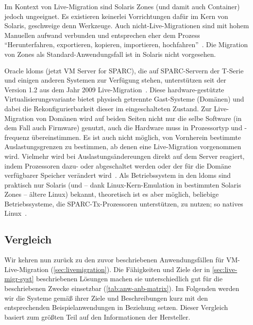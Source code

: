 Im Kontext von Live-Migration sind Solaris Zones (und damit auch
Container) jedoch ungeeignet. Es existieren keinerlei Vorrichtungen
dafür im Kern von Solaris, geschweige denn Werkzeuge. Auch
nicht-Live-Migrationen sind mit hohem Manuellen aufwand verbunden und
entsprechen eher dem Prozess "`Herunterfahren, exportieren, kopieren,
importieren, hochfahren"'~\cite{Kimchi:Solaris-Zones-m}. Die Migration
von Zones als Standard-Anwendungsfall ist in Solaris nicht vorgesehen.

Oracle \acfp{ldom} (jetzt VM Server for SPARC), die auf SPARC-Servern
der T-Serie und einigen anderen Systemen zur Verfügung stehen,
unterstützen seit der Version 1.2 aus dem Jahr 2009
Live-Migration~\cite{Laurent:Answering-a-cus}. Diese
hardware-gestützte Virtualisierungsvariante bietet physisch getrennte
Gast-Systeme (Domänen) und dabei die Rekonfigurierbarkeit dieser im
eingeschalteten Zustand. Zur Live-Migration von Domänen wird auf
beiden Seiten nicht nur die selbe Software (in dem Fall auch Firmware)
genutzt, auch die Hardware muss in Prozessortyp und -frequenz
übereinstimmen. Es ist auch nicht möglich, von Vornherein bestimmte
Auslastungsgrenzen zu bestimmen, ab denen eine Live-Migration
vorgenommen wird. Vielmehr wird bei Auslastungsändereungen direkt auf
dem Server reagiert, indem \zB Prozessoren dazu- oder abgeschaltet
werden oder der für die Domäne verfügbarer Speicher verändert
wird~\cite{2010:Oracle-VM-Serve}. Als Betriebssystem in den \acp{ldom}
sind praktisch nur Solaris (und -- dank Linux-Kern-Emulation in
bestimmten Solaris Zones -- ältere Linux) bekannt, theoretisch ist es
aber möglich, beliebige Betriebssysteme, die SPARC-Tx-Prozessoren
unterstützen, zu nutzen; so \zB natives
Linux~\cite{Chartre:Linux-with-LDom}.



\subsection{Vergleich}
Wir kehren nun zurück zu den zuvor beschriebenen Anwendungsfällen für
\ac{VM}-Live-Migration (\autoref{sec:livemigration}). Die Fähigkeiten
und Ziele der in \autoref{sec:live-migr-syst} beschriebenen Lösungen
machen sie unterschiedlich gut für die beschriebenen Zwecke einsetzbar
(\autoref{tab:anw-anb-matrix}). Im Folgenden werden wir die Systeme
gemäß ihrer Ziele und Beschreibungen kurz mit den entsprechenden
Beispielanwendungen in Beziehung setzen. Dieser Vergleich basiert zum
größten Teil auf den Informationen der Hersteller.

